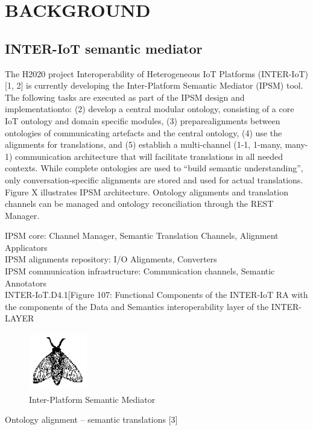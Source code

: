 \documentclass{sig-alternate-05-2015}
\begin{document}
\section{BACKGROUND}

\subsection{INTER-IoT semantic mediator}
The H2020 project Interoperability of Heterogeneous IoT Platforms (INTER-IoT) [1, 2] is currently developing the  Inter-Platform Semantic Mediator (IPSM) tool. The following tasks are executed as part of the IPSM design and implementationto:  (2) develop a central modular ontology, consisting of a core IoT ontology and domain specific modules, (3) preparealignments between ontologies of communicating artefacts and the central ontology,  (4) use the alignments for translations, and (5) establish a multi-channel (1-1, 1-many, many-1) communication architecture that will facilitate translations in all needed contexts. While complete ontologies are used to “build semantic understanding”, only conversation-specific alignments are stored and used for actual translations. Figure X illustrates IPSM architecture. Ontology alignments and translation channels can be managed and ontology reconciliation  through the REST Manager.

IPSM core: Channel Manager, Semantic Translation Channels, Alignment Applicators \\
IPSM alignments repository: I/O Alignments, Converters \\
IPSM communication infrastructure: Communication channels, Semantic Annotators \\

INTER-IoT.D4.1[Figure 107: Functional Components of the INTER-IoT RA with the components of the Data and Semantics interoperability layer of the INTER-LAYER\\

\begin{figure}
\centering
\includegraphics[height=1in, width=1in]{fly}
\caption{Inter-Platform Semantic Mediator}
\end{figure}

Ontology alignment – semantic translations [3]
\end{document}

